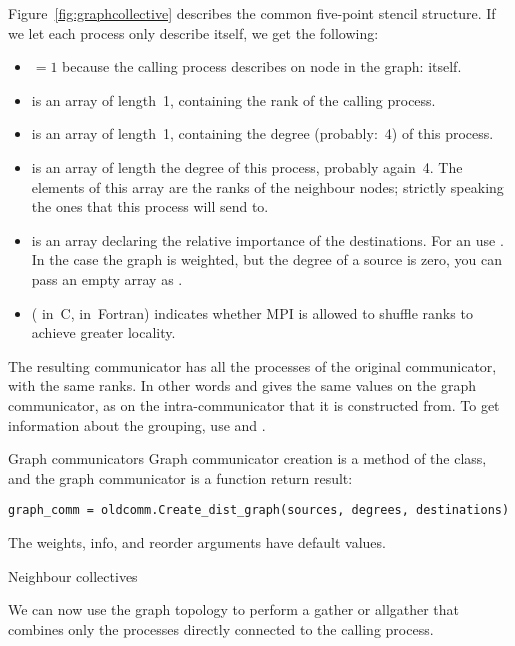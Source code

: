 Figure~\ref{fig:graphcollective} describes the common five-point
stencil structure. If we let each process only describe itself, we get
the following:
\begin{itemize}
\item {}$=1$ because the calling process describes on node
  in the graph: itself.
\item {} is an array of length~1, containing the rank of the
  calling process.
\item {} is an array of length~1, containing the degree
  (probably:~4) of this process.
\item {} is an array of length the degree of this
  process, probably again~4. The elements of this array are the ranks
  of the neighbour nodes; strictly speaking the ones that this process
  will send to.
\item {} is an array declaring the relative importance of the
  destinations. For an  use
  .
  In the case the graph is weighted, but the degree of a source is zero, you can pass
  an empty array as .
\item {} ( in~C,  in~Fortran) indicates
  whether MPI is allowed to shuffle ranks to achieve greater locality.
\end{itemize}

The resulting communicator has all the processes of the original
communicator, with the same ranks.
In other words  and 
gives the same values on the graph communicator, as on the intra-communicator
that it is constructed from. To get information about the grouping,
use 
and .

\begin{pythonnote}{Graph communicators}
  Graph communicator creation is a method of the  class,
  and the graph communicator is a function return result:
\begin{lstlisting}
graph_comm = oldcomm.Create_dist_graph(sources, degrees, destinations)
\end{lstlisting}
  The weights, info, and reorder arguments have default values.
\end{pythonnote}

 {Neighbour collectives}

We can now use the graph topology to perform a gather or allgather
that combines only the processes directly connected to the calling
process.

